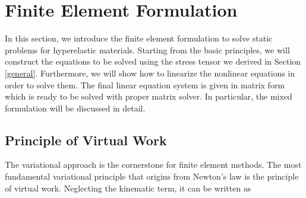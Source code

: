 %
\section{Finite Element Formulation}
In this section, we introduce the finite element formulation to solve static problems for hyperelastic materials. Starting from the basic principles, we will construct the equations to be solved using the stress tensor we derived in Section \ref{general}. Furthermore, we will show how to linearize the nonlinear equations in order to solve them. The final linear equation system is given in matrix form which is ready to be solved with proper matrix solver. In particular, the mixed formulation will be discussed in detail.

%
\subsection{Principle of Virtual Work} \label{PVW}
The variational approach is the cornerstone for finite element methods. The most fundamental variational principle that origins from Newton's law is the principle of virtual work. Neglecting the kinematic term, it can be written as
